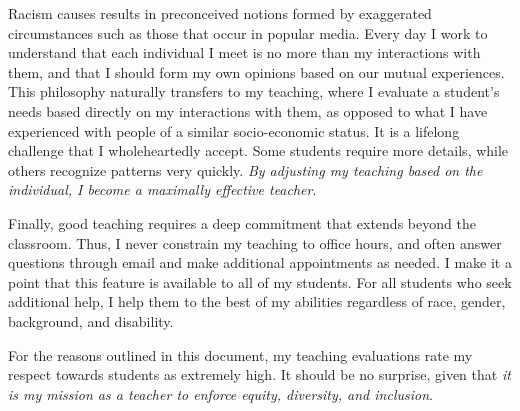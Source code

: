 \documentclass[a4paper,11pt]{article}
\begin{document}
Racism causes results in preconceived notions formed by exaggerated circumstances such as those that occur in popular media. Every day I work to understand that each individual I meet is no more than my interactions with them, and that I should form my own opinions based on our mutual experiences. This philosophy naturally transfers to my teaching, where I evaluate a student's needs based directly on my interactions with them, as opposed to what I have experienced with people of a similar socio-economic status. It is a lifelong challenge that I wholeheartedly accept. Some students require more details, while others recognize patterns very quickly. \textit{By adjusting my teaching based on the individual, I become a maximally effective teacher}.

Finally, good teaching requires a deep commitment that extends beyond the classroom. Thus, I never constrain my teaching to office hours, and often answer questions through email and make additional appointments as needed. I make it a point that this feature is available to all of my students. For all students who seek additional help, I help them to the best of my abilities regardless of race, gender, background, and disability.

For the reasons outlined in this document, my teaching evaluations rate my respect towards students as extremely high. It should be no surprise, given that \textit{it is my mission as a teacher to enforce equity, diversity, and inclusion}.
\end{document}
